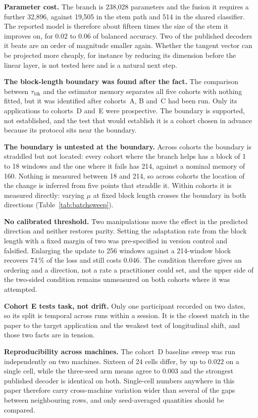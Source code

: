 \documentclass[a4paper,fleqn]{cas-dc}
\begin{document}
\textbf{Parameter cost.} The branch is 238{,}028 parameters and the fusion it requires a further 32{,}896, against 19{,}505 in the stem path and 514 in the shared classifier. The reported model is therefore about fifteen times the size of the stem it improves on, for $0.02$ to $0.06$ of balanced accuracy. Two of the published decoders it beats are an order of magnitude smaller again. Whether the tangent vector can be projected more cheaply, for instance by reducing its dimension before the linear layer, is not tested here and is a natural next step.

\textbf{The block-length boundary was found after the fact.} The comparison between $\tau_{\mathrm{blk}}$ and the estimator memory separates all five cohorts with nothing fitted, but it was identified after cohorts~A, B and~C had been run. Only its applications to cohorts~D and~E were prospective. The boundary is supported, not established, and the test that would establish it is a cohort chosen in advance because its protocol sits near the boundary.

\textbf{The boundary is untested at the boundary.} Across cohorts the boundary is straddled but not located: every cohort where the branch helps has a block of 1 to 18 windows and the one where it fails has 214, against a nominal memory of 160. Nothing is measured between 18 and 214, so across cohorts the location of the change is inferred from five points that straddle it. Within cohorts it is measured directly: varying $\mu$ at fixed block length crosses the boundary in both directions (Table~\ref{tab:batchsweep}).

\textbf{No calibrated threshold.} Two manipulations move the effect in the predicted direction and neither restores parity. Setting the adaptation rate from the block length with a fixed margin of two was pre-specified in version control and falsified. Enlarging the update to 256 windows against a 214-window block recovers 74\,\% of the loss and still costs $0.046$. The condition therefore gives an ordering and a direction, not a rate a practitioner could set, and the upper side of the two-sided condition remains unmeasured on both cohorts where it was attempted.

\textbf{Cohort E tests task, not drift.} Only one participant recorded on two dates, so its split is temporal across runs within a session. It is the closest match in the paper to the target application and the weakest test of longitudinal shift, and those two facts are in tension.

\textbf{Reproducibility across machines.} The cohort~D baseline sweep was run independently on two machines. Sixteen of 24 cells differ, by up to $0.022$ on a single cell, while the three-seed arm means agree to $0.003$ and the strongest published decoder is identical on both. Single-cell numbers anywhere in this paper therefore carry cross-machine variation wider than several of the gaps between neighbouring rows, and only seed-averaged quantities should be compared.
\end{document}
